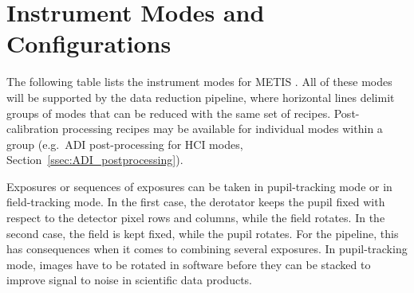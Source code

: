 \section{Instrument Modes and Configurations}
\label{sec:instrument_modes}

The following table lists the instrument modes for METIS
\cite{METIS-operational_concept}. All of these modes will be
supported by the data reduction pipeline, where horizontal lines
delimit groups of modes that can be reduced with the same set of
recipes.
Post-calibration processing recipes may be available for individual
modes within a group (e.g.\ \ac{ADI} post-processing for HCI modes, Section~\ref{ssec:ADI_postprocessing}).

Exposures or sequences of exposures can be taken in pupil-tracking
mode or in field-tracking mode. In the first case, the derotator keeps
the pupil fixed with respect to the detector pixel rows and columns,
while the field rotates. In the second case, the field is kept fixed,
while the pupil rotates. For the pipeline, this has consequences when
it comes to combining several exposures. In pupil-tracking mode,
images have to be rotated in software before they can be stacked to
improve signal to noise in scientific data products.

